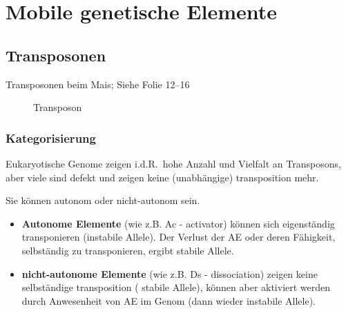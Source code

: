 

\section{Mobile genetische Elemente}\label{sec:mobile-genetische-elemente}

\subsection{Transposonen}\label{subsec:transposonen}

\begin{bsp}
    Transposonen beim Mais; Siehe Folie 12--16
\end{bsp}

\begin{figure}[H]
    \centering
    \caption{Transposon}\label{fig:composite_transposon}
\end{figure}

\subsubsection{Kategorisierung}


Eukaryotische Genome zeigen i.d.R.\ hohe Anzahl und Vielfalt an
Transposons, aber viele sind defekt und zeigen keine (unabhängige) \gls{transposition}
mehr.

Sie können autonom oder nicht-autonom sein.
\begin{itemize}
    \item \textbf{Autonome Elemente} (wie z.B. Ac - activator) können sich eigenständig transponieren (instabile
    Allele).
    Der Verlust der AE oder deren Fähigkeit, selbständig zu transponieren,
    ergibt stabile Allele.
    \item \textbf{nicht-autonome Elemente}  (wie z.B. Ds - dissociation) zeigen keine selbständige \gls{transposition} (
    stabile Allele),
    können aber aktiviert werden durch Anwesenheit von AE im Genom
    (dann wieder instabile Allele).
\end{itemize}

